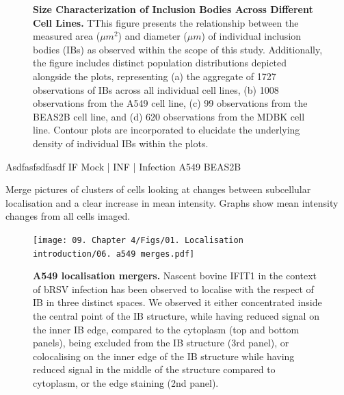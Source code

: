 \begin{figure}
    \caption[Size Characterization of Inclusion Bodies Across Different Cell Lines.]{\textbf{Size Characterization of Inclusion Bodies Across Different Cell Lines.} TThis figure presents the relationship between the measured area (\(\mu m^2\)) and diameter (\(\mu m\)) of individual inclusion bodies (IBs) as observed within the scope of this study. Additionally, the figure includes distinct population distributions depicted alongside the plots, representing (a) the aggregate of 1727 observations of IBs across all individual cell lines, (b) 1008 observations from the A549 cell line, (c) 99 observations from the BEAS2B cell line, and (d) 620 observations from the MDBK cell line. Contour plots are incorporated to elucidate the underlying density of individual IBs within the plots.}
    \label{fig:Size Characterization of Inclusion Bodies Across Different Cell Lines}
    
\end{figure}


Asdfasfsdfasdf \newline
IF Mock | INF | Infection \newline
A549 BEAS2B

Merge pictures of clusters of cells looking at changes between subcellular localisation and a clear increase in mean intensity. Graphs show mean intensity changes from all cells imaged.

\begin{figure}
    \centering
    \texttt{[image: 09. Chapter 4/Figs/01. Localisation introduction/06. a549 merges.pdf]}
    \caption[A549 localisation mergers.]{\textbf{A549 localisation mergers.} Nascent bovine IFIT1 in the context of bRSV infection has been observed to localise with the respect of IB in three distinct spaces. We observed it either concentrated inside the central point of the IB structure, while having reduced signal on the inner IB edge, compared to the cytoplasm (top and bottom panels), being excluded from the IB structure (3rd panel), or colocalising on the inner edge of the IB structure while having reduced signal in the middle of the structure compared to cytoplasm, or the edge staining (2nd panel).}
    \label{fig:A549 localisation mergers.}
\end{figure}


